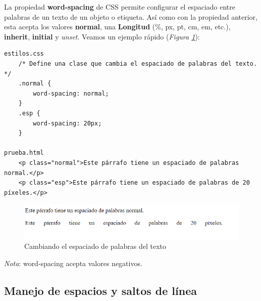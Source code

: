 La propiedad \textbf{word-spacing} de CSS permite configurar el espaciado entre palabras de un texto de un objeto o etiqueta. Así como con la propiedad anterior, esta acepta los valores \textbf{normal}, una \textbf{Longitud} (\%, px, pt, cm, em, etc.), \textbf{inherit}, \textbf{initial} y \textit{unset}. Veamos un ejemplo rápido (\textit{Figura \ref{fig: 17}}):
\begin{lstlisting}
estilos.css
    /* Define una clase que cambia el espaciado de palabras del texto. */
    .normal {
        word-spacing: normal;
    }
    .esp {
        word-spacing: 20px;
    }
        
prueba.html
    <p class="normal">Este párrafo tiene un espaciado de palabras normal.</p>
    <p class="esp">Este párrafo tiene un espaciado de palabras de 20 píxeles.</p>
\end{lstlisting}
\begin{figure}[H]
    \centering
    \caption{Cambiando el espaciado de palabras del texto}
    \label{fig: 17}
    \includegraphics[width=14cm]{ss/fuentes-ws.png}
\end{figure}

\textit{Nota}: word-spacing acepta valores negativos.


\subsection{Manejo de espacios y saltos de línea}

